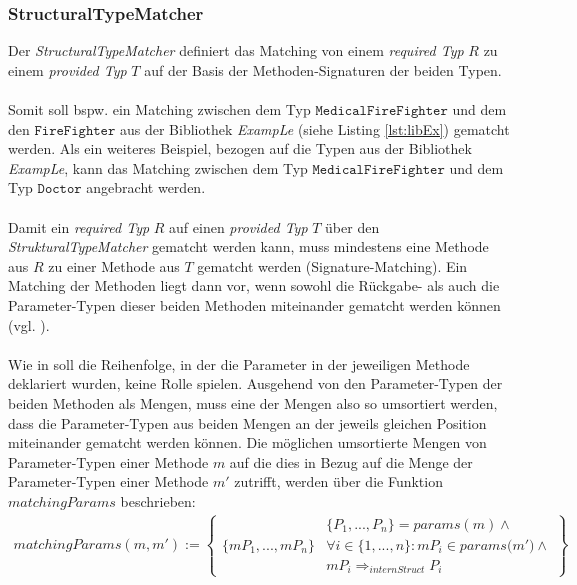 \subsubsection{StructuralTypeMatcher} \label{subsec_structmatcher}
Der \emph{StructuralTypeMatcher} definiert das Matching von einem \emph{required Typ} $R$ zu einem \emph{provided Typ} $T$ auf der Basis der Methoden-Signaturen der beiden Typen.
\\\\
Somit soll bspw. ein Matching zwischen dem Typ $\texttt{MedicalFireFighter}$ und dem den $\texttt{FireFighter}$ aus der Bibliothek \emph{ExampLe}  (siehe Listing \ref{lst:libEx}) gematcht werden. Als ein weiteres Beispiel, bezogen auf die Typen aus der Bibliothek \emph{ExampLe}, kann das Matching zwischen dem Typ $\texttt{MedicalFireFighter}$ und dem Typ $\texttt{Doctor}$ angebracht werden.
\\\\
Damit ein \emph{required Typ} $R$ auf einen \emph{provided Typ} $T$ über den \emph{StrukturalTypeMatcher} gematcht werden kann, muss mindestens eine Methode aus $R$ zu einer Methode aus $T$ gematcht werden (Signature-Matching). Ein Matching der Methoden liegt dann vor, wenn sowohl die Rückgabe- als auch die Parameter-Typen dieser beiden Methoden miteinander gematcht werden können (vgl. \cite{moormann}). 
\\\\
Wie in \cite{moormann} soll die Reihenfolge, in der die Parameter in der jeweiligen Methode deklariert wurden, keine Rolle spielen. Ausgehend von den Parameter-Typen der beiden Methoden als Mengen, muss eine der Mengen also so umsortiert werden, dass die Parameter-Typen aus beiden Mengen an der jeweils gleichen Position miteinander gematcht werden können.
Die möglichen umsortierte Mengen von Parameter-Typen einer Methode $m$ auf die dies in Bezug auf die Menge der Parameter-Typen einer Methode $m'$ zutrifft, werden über die Funktion $\mathit{matchingParams}$ beschrieben:
\begin{gather*}
\mathit{matchingParams(m, m')} :=
\left\{
\begin{array}{l|l}
	&
	\{\mathit{P_1,...,P_n}\} = \mathit{params(m)} \wedge \mathit{ }
	\\
	\{\mathit{mP_1,...,mP_n}\}
	&
	\forall i \in \{1,...,n\}: \mathit{mP_i} \in \mathit{params(m'}) \wedge \mathit{ }
	\\
	&
	\mathit{mP_i} \Rightarrow_{internStruct} \mathit{P_i}
\end{array}
\right\}
\end{gather*}
